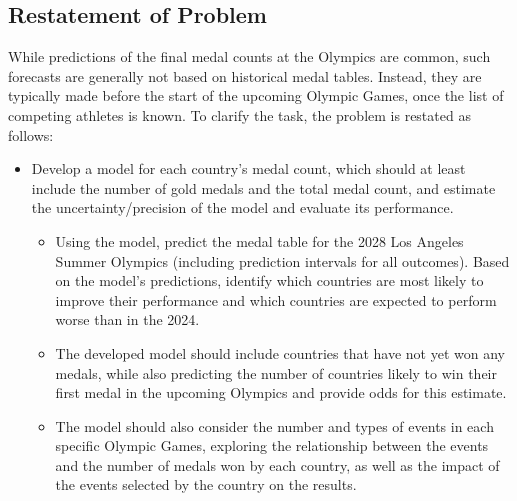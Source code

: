 \documentclass[12pt]{article}  %
\begin{document}
\subsection{Restatement of Problem}
While predictions of the final medal counts at the Olympics are common, such forecasts are generally not based on historical medal tables. Instead, they are typically made before the start of the upcoming Olympic Games, once the list of competing athletes is known. To clarify the task, the problem is restated as follows:

\begin{itemize}
	\setlength{\parsep}{0ex} %
	\setlength{\topsep}{2ex} %
	\setlength{\itemsep}{1ex} %
	\item Develop a model for each country's medal count, which should at least include the number of gold medals and the total medal count, and estimate the uncertainty/precision of the model and evaluate its performance.
		\begin{itemize}
		\item[1)]
Using the model, predict the medal table for the 2028 Los Angeles Summer Olympics (including prediction intervals for all outcomes). Based on the model's predictions, identify which countries are most likely to improve their performance and which countries are expected to perform worse than in the 2024.
	\end{itemize}
	\begin{itemize}
		\item[2)]
		The developed model should include countries that have not yet won any medals, while also predicting the number of countries likely to win their first medal in the upcoming Olympics and provide odds for this estimate.
	\end{itemize}
		\begin{itemize}
		\item[3)]
The model should also consider the number and types of events in each specific Olympic Games, exploring the relationship between the events and the number of medals won by each country, as well as the impact of the events selected by the country on the results.
	\end{itemize}
	

\end{itemize}
\end{document}
